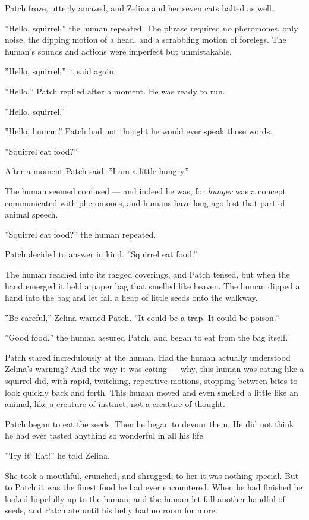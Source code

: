 \documentclass[12pt]{book}
\begin{document}
Patch froze, utterly amazed, and Zelina and her seven cats halted as
well.

''Hello, squirrel,'' the human repeated. The phrase required no
pheromones, only noise, the dipping motion of a head, and a scrabbling
motion of forelegs. The human's sounds and actions were imperfect but
unmistakable.

''Hello, squirrel,'' it said again.

''Hello,'' Patch replied after a moment. He was ready to run.

''Hello, squirrel.''

''Hello, human.'' Patch had not thought he would ever speak those
words.

''Squirrel eat food?''

After a moment Patch said, ''I am a little hungry.''

The human seemed confused --- and indeed he was, for \textit{hunger}
was a concept communicated with pheromones, and humans have long ago
lost that part of animal speech.

''Squirrel eat food?'' the human repeated.

Patch decided to answer in kind. ''Squirrel eat food.''

The human reached into its ragged coverings, and Patch tensed, but
when the hand emerged it held a paper bag that smelled like
heaven. The human dipped a hand into the bag and let fall a heap of
little seeds onto the walkway.

''Be careful,'' Zelina warned Patch. ''It could be a trap. It could be
poison.''

''Good food,'' the human assured Patch, and began to eat from the bag
itself.

Patch stared incredulously at the human. Had the human actually
understood Zelina's warning? And the way it was eating --- why, this
human was eating like a squirrel did, with rapid, twitching,
repetitive motions, stopping between bites to look quickly back and
forth. This human moved and even smelled a little like an animal, like
a creature of instinct, not a creature of thought.

Patch began to eat the seeds. Then he began to devour them. He did not
think he had ever tasted anything so wonderful in all his life.

''Try it! Eat!'' he told Zelina.

She took a mouthful, crunched, and shrugged; to her it was nothing
special. But to Patch it was the finest food he had ever
encountered. When he had finished he looked hopefully up to the human,
and the human let fall another handful of seeds, and Patch ate until
his belly had no room for more.
\end{document}
